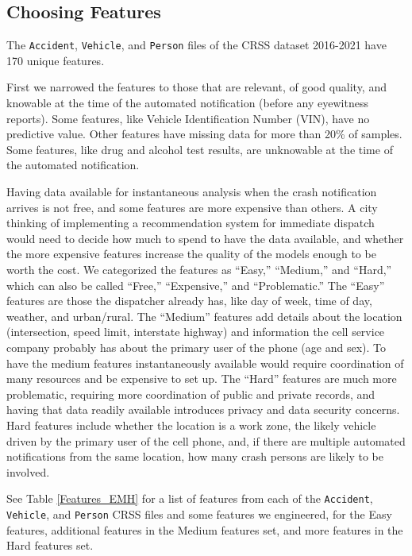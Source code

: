 \subsection{Choosing Features}
\label{features}

The \verb|Accident|, \verb|Vehicle|, and \verb|Person| files of the CRSS dataset 2016-2021 have 170 unique features.  

First we narrowed the features to those that are relevant, of good quality, and knowable at the time of the automated notification (before any eyewitness reports).  Some features, like Vehicle Identification Number (VIN), have no predictive value.  Other features have missing data for more than 20\% of samples.  Some features, like drug and alcohol test results, are unknowable at the time of the automated notification.

Having data available for instantaneous analysis when the crash notification arrives is not free, and some features are more expensive than others.  A city thinking of implementing a recommendation system for immediate dispatch would need to decide how much to spend to have the data available, and whether the more expensive features increase the quality of the models enough to be worth the cost.  We categorized the features as ``Easy,'' ``Medium,'' and ``Hard,'' which can also be called ``Free,'' ``Expensive,'' and ``Problematic.''   The ``Easy'' features are those the dispatcher already has, like day of week, time of day, weather, and urban/rural.  The ``Medium'' features add details about the location (intersection, speed limit, interstate highway) and information the cell service company probably has about the primary user of the phone (age and sex).  To have the medium features instantaneously available would require coordination of many resources and be expensive to set up.  The ``Hard'' features are much more problematic, requiring more coordination of public and private records, and having that data readily available introduces privacy and data security concerns.  Hard features include whether the location is a work zone, the likely vehicle driven by the primary user of the cell phone, and, if there are multiple automated notifications from the same location, how many crash persons are likely to be involved.   

See Table \ref{Features_EMH} for a list of features from each of the \verb|Accident|, \verb|Vehicle|, and \verb|Person| CRSS files and some features we engineered, for the Easy features, additional features in the Medium features set, and more features in the Hard features set.  

